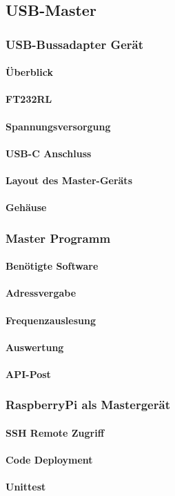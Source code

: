 \subsection{USB-Master}
\subsubsection{USB-Bussadapter Gerät}
\paragraph{Überblick}
\paragraph{FT232RL}
\paragraph{Spannungsversorgung}
\paragraph{USB-C Anschluss}
\paragraph{Layout des Master-Geräts}
\paragraph{Gehäuse}

\subsubsection{Master Programm}
\paragraph{Benötigte Software}
\paragraph{Adressvergabe}
\paragraph{Frequenzauslesung}

\paragraph{Auswertung}
\paragraph{API-Post}

\subsubsection{RaspberryPi als Mastergerät}
\paragraph{SSH Remote Zugriff}
\paragraph{Code Deployment}
\paragraph{Unittest}

\pagebreak


